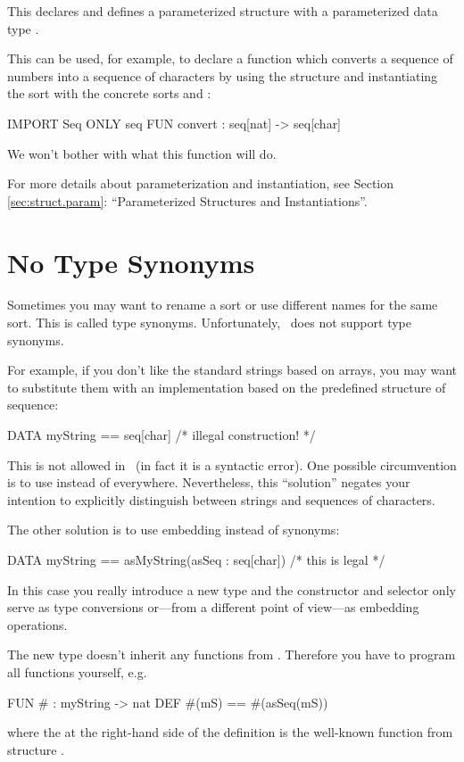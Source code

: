 This declares and defines a parameterized structure with a
parameterized data type .

This can be used, for example, to  declare a function  which
converts a sequence of numbers into a sequence of characters by using
the  structure  and instantiating the sort  with the
concrete sorts  and : 

\begin{prog}
  IMPORT Seq ONLY seq
  FUN convert : seq[nat] -> seq[char]
\end{prog}
We won't bother with what this function will do.

For more details about parameterization and instantiation, see Section
\ref{sec:struct.param}: ``Parameterized Structures and Instantiations''.


\section{No Type Synonyms}
\label{sec:synonType}
Sometimes you may want to rename a sort  or use different names
for the same sort. This is called type synonyms. 
Unfortunately, \opal\ does not support type synonyms.

For example, if you don't like the standard strings based on arrays,
you may want to substitute them with an implementation based on the
predefined structure of sequence:
\begin{prog}
  DATA myString == seq[char]     /* illegal construction! */
\end{prog}

This is not allowed in \opal\ (in fact it is a syntactic error).
One possible circumvention  is to use  instead of 
everywhere. Nevertheless, this ``solution'' negates your intention
to explicitly distinguish between strings and sequences of characters.

The other solution is to use embedding instead of synonyms:
\begin{prog}
  DATA myString == asMyString(asSeq : seq[char]) /* this is legal */
\end{prog}
In this case you really introduce a new type and the constructor and
selector only serve as type conversions or---from a different point of
view---as embedding operations.

The new type  doesn't inherit any functions from
. Therefore you have to program all functions yourself,
e.g.
\begin{prog}
  FUN \# : myString -> nat
  DEF \#(mS) == \#(asSeq(mS))
\end{prog}
where the \pro{\#} at the right-hand side of the definition is the
well-known function from structure .
